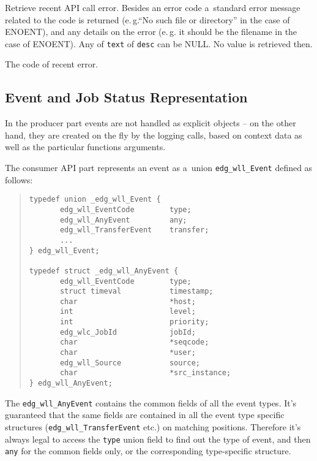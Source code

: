 \documentclass{egee}
\def\eg{e.\,g.\xspace}
\begin{document}
\Synopsis
{}

\Description
Retrieve recent API call error.
Besides an error code a~standard error message related to the code
is returned (\eg ``No such file or directory'' in the case of ENOENT),
and any details on the error (\eg it should be the filename in the case of 	ENOENT).
Any of \verb'text' of \verb'desc' can be NULL. No value is retrieved then.

\Return
The code of recent error.


\subsection{Event and Job Status Representation}
In the producer part events are not handled as explicit objects --
on the other hand, they are created on the fly by the logging calls,
based on context data as well as the particular functions arguments.

The consumer API part represents an event as a~union \verb'edg_wll_Event'
defined as follows:
\begin{quote}
\begin{verbatim}
typedef union _edg_wll_Event {
       edg_wll_EventCode        type;
       edg_wll_AnyEvent         any;
       edg_wll_TransferEvent    transfer;
       ...
} edg_wll_Event;

typedef struct _edg_wll_AnyEvent {
       edg_wll_EventCode        type;
       struct timeval           timestamp;
       char                     *host;
       int                      level;
       int                      priority;
       edg_wlc_JobId            jobId;
       char                     *seqcode;
       char                     *user;
       edg_wll_Source           source;
       char                     *src_instance;
} edg_wll_AnyEvent;
\end{verbatim}

\end{quote}

The \verb'edg_wll_AnyEvent' contains the common fields of all the event types.
It's guaranteed that the same fields are contained in all the event type
specific structures (\verb'edg_wll_TransferEvent' etc.) on matching positions.
Therefore it's always legal to access the \verb'type' union field to find
out the type of event, and then \verb'any' for the common fields only,
or the corresponding type-specific structure.
\end{document}
